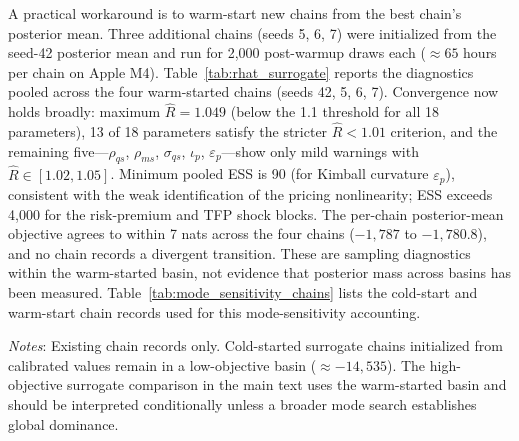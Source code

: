 \documentclass[12pt]{article}
\theoremstyle{plain}
\theoremstyle{definition}
\theoremstyle{remark}
\newcommand{\tablenotes}[1]{%
  \par\vspace{0.5em}%
  \noindent\begin{minipage}{\textwidth}%
  \raggedright\footnotesize #1%
  \end{minipage}\par%
}
\begin{document}
A practical workaround is to warm-start new chains from the best chain's posterior mean. Three additional chains (seeds 5, 6, 7) were initialized from the seed-42 posterior mean and run for 2{,}000 post-warmup draws each ($\approx 65$ hours per chain on Apple M4). Table~\ref{tab:rhat_surrogate} reports the diagnostics pooled across the four warm-started chains (seeds 42, 5, 6, 7). Convergence now holds broadly: maximum $\hat{R} = 1.049$ (below the 1.1 threshold for all 18 parameters), 13 of 18 parameters satisfy the stricter $\hat{R} < 1.01$ criterion, and the remaining five---$\rho_{qs}$, $\rho_{ms}$, $\sigma_{qs}$, $\iota_p$, $\varepsilon_p$---show only mild warnings with $\hat{R} \in [1.02, 1.05]$. Minimum pooled ESS is 90 (for Kimball curvature $\varepsilon_p$), consistent with the weak identification of the pricing nonlinearity; ESS exceeds 4{,}000 for the risk-premium and TFP shock blocks. The per-chain posterior-mean objective agrees to within 7 nats across the four chains ($-1{,}787$ to $-1{,}780.8$), and no chain records a divergent transition. These are sampling diagnostics within the warm-started basin, not evidence that posterior mass across basins has been measured.
Table~\ref{tab:mode_sensitivity_chains} lists the cold-start and warm-start chain records used for this mode-sensitivity accounting.

\begin{table}[htbp]
\centering
\caption{Mode Sensitivity Across Extended-Sample Chain Artifacts}
\label{tab:mode_sensitivity_chains}
\resizebox{\textwidth}{!}{}
\smallskip
\tablenotes{\textit{Notes}: Existing chain records only. Cold-started surrogate chains initialized from calibrated values remain in a low-objective basin ($\approx -14{,}535$). The high-objective surrogate comparison in the main text uses the warm-started basin and should be interpreted conditionally unless a broader mode search establishes global dominance.}
\end{table}
\end{document}

